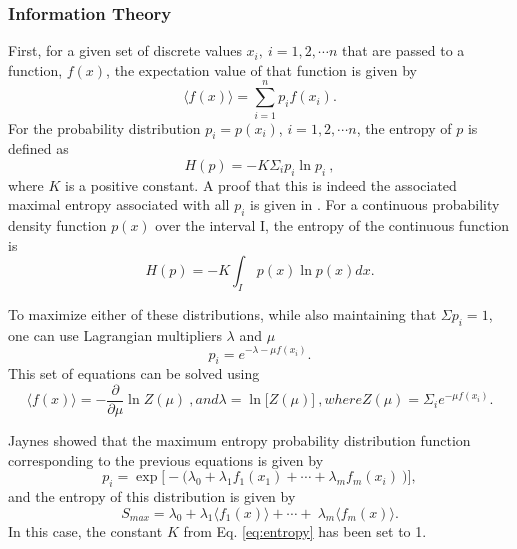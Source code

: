 \subsubsection*{Information Theory}

First, for a given set of discrete values $x_i, \: i=1,2, \cdots n$
that are passed to a function, $f(x)$, the expectation value of that function is given
by
\begin{equation}
  \big\langle f(x) \big\rangle = \sum_{i=1}^n p_if(x_i).
\end{equation}
For the probability distribution $p_i = p(x_i)$, $i=1,2, \cdots n$, the entropy of
$p$ is defined as
\begin{equation}
  H(p) = - K \Sigma_i p_i \ln p_i \:,
  \label{eq:entropy}
\end{equation}
where $K$ is a positive constant. A proof that this is indeed the associated
maximal entropy associated with all $p_i$ is given in
\cite{jaynes_information_1957}.
For a continuous probability density function $p(x)$ over the interval I, the
entropy of the continuous function is
\begin{equation}
  H(p) = - K \int_I\ p(x) \ln p(x) dx .
\end{equation}

To maximize either of these distributions, while also maintaining that $\Sigma
p_i = 1$, one can use Lagrangian multipliers $\lambda$ and $\mu$
\begin{equation}
  p_i = e^{-\lambda-\mu f(x_i)} .
\end{equation}
This set of equations can be solved using
\begin{subequations}
  \begin{equation}
    \big\langle f(x) \big\rangle = - \frac{\partial}{\partial \mu} \ln Z(\mu)\:,
  \end{equation}
  and
  \begin{equation}
    \lambda = \ln\big[Z(\mu)\big] \:,
  \end{equation}
  where
  \begin{equation}
    Z(\mu) = \Sigma_i e^{-\mu f(x_i)} .
  \end{equation}
\end{subequations}

Jaynes \cite{jaynes_information_1957, jaynes_information_1957-1}
showed that the maximum
entropy probability distribution function corresponding to the previous
equations is given by
\begin{equation}
  p_i= \exp \big[ - \big( \lambda_0 + \lambda_1f_1(x_1) + \cdots + \lambda_m f_m(x_i) \
    \big) \big] ,
\end{equation}
and the entropy of this distribution is given by
\begin{equation}
  S_{max} = \lambda_0 + \lambda_1 \big\langle f_1 (x) \big\rangle + \cdots + \
  \lambda_m \big\langle f_m(x) \big\rangle .
\end{equation}
In this case, the constant $K$ from Eq. \eqref{eq:entropy} has been set to 1.

